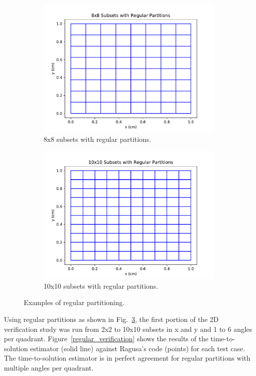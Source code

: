 \begin{figure}[H]
\begin{subfigure}[b]{0.45\textwidth}
  \includegraphics[width=\textwidth]{../cut_line_files/8_regular.pdf}
  \caption{8x8 subsets with regular partitions.}
  \label{8regular}
\end{subfigure}
\begin{subfigure}[b]{0.45\textwidth}
  \includegraphics[width=\textwidth]{../cut_line_files/10_regular.pdf}
  \caption{10x10 subsets with regular partitions.}
  \label{10regular}
\end{subfigure}
\caption{Examples of regular partitioning.}
\label{regular_partitions}
\end{figure}

Using regular partitions as shown in Fig.~\ref{regular_partitions}, the first portion of the 2D verification study was run from 2x2 to 10x10 subsets in x and y and 1 to 6 angles per quadrant.  Figure~\ref{regular_verification} shows the results of the time-to-solution estimator (solid line) against Ragusa's code (points) for each test case. The time-to-solution estimator is in perfect agreement for regular partitions with multiple angles per quadrant.

